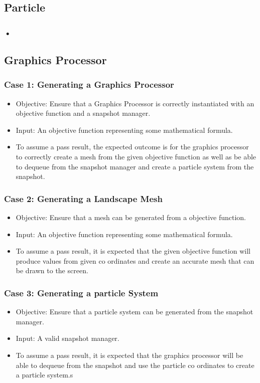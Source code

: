 \documentclass[11pt]{article}
\begin{document}
\subsection{Particle}
\subsubsection{•}
\subsection{Graphics Processor}
\subsubsection{Case 1: Generating a Graphics Processor}
\begin{itemize}
	\item Objective: Ensure that a Graphics Processor is correctly instantiated with an objective function and a snapshot manager.
	\item Input: An objective function representing some mathematical formula.
	\item To assume a pass result, the expected outcome is for the graphics processor to correctly create a mesh from the given objective function as well as be able to dequeue from the snapshot manager and create a particle system from the snapshot.
\end{itemize}

\subsubsection{Case 2: Generating a Landscape Mesh}
\begin{itemize}
	\item Objective: Ensure that a mesh can be generated from a objective function.
	\item Input: An objective function representing some mathematical formula.
	\item To assume a pass result, it is expected that the given objective function will produce values from given co ordinates and create an accurate mesh that can be drawn to the screen.
\end{itemize}

\subsubsection{Case 3: Generating a particle System}
\begin{itemize}
	\item Objective: Ensure that a particle system can be generated from the snapshot manager.
	\item Input: A valid snapshot manager.
	\item To assume a pass result, it is expected that the graphics processor will be able to dequeue from the snapshot and use the particle co ordinates to create a particle system.s
\end{itemize}
\end{document}

